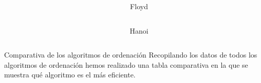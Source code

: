 \documentclass[spanish]{beamer}
\begin{document}
\begin{frame}
	\begin{center}
		\resizebox*{11cm}{!}{
				
			}
	\end{center}
\end{frame}

\begin{frame}
	\begin{columns}[c] %
		\begin{column}{.6\textwidth}
		\end{column}%
		
		\hfill%
		
		\begin{column}{.3\textwidth}
			Floyd
		\end{column}%
		
	\end{columns}
\end{frame}

\begin{frame}
	\begin{columns}[c] %
		\begin{column}{.6\textwidth}
		\end{column}%
		
		\hfill%
		
		\begin{column}{.3\textwidth}
			Hanoi
		\end{column}%
		
	\end{columns}
\end{frame}

\begin{frame}{Comparativa de los algoritmos de ordenación}
	Recopilando los datos de todos los algoritmos de ordenación hemos realizado una tabla comparativa en la que se muestra qué algoritmo es el más eficiente.
\end{frame}

\begin{frame}
	\begin{center}
		\resizebox*{11cm}{!}{
				
			}
		
	\end{center}
\end{frame}
\end{document}
